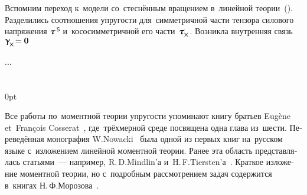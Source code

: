 

\label{para:caseoflatenttrihedron.largedisplacementsandrotations}

\begin{otherlanguage}{russian}

Вспомним переход к~модели со~стеснённым вращением в~линейной теории~(). Разделились соотношения упругости для~симметричной части тензора силового напряжения ${\forcestresstensor^{\hspace{.32ex}\mathsf{S}}}\hspace{-0.2ex}$ и~кососимметричной его части~${\forcestresstensor_{\hspace{-0.1ex}\Xcompanion}}$. Возникла внутренняя связь~${\distortiontensor_{\hspace{-0.25ex}\Xcompanion} \hspace{-0.32ex} = \bm{0}}$

...




\end{otherlanguage}

\section*{\small \wordforbibliography}

\begin{changemargin}{\parindent}{0pt}
\fontsize{10}{12}\selectfont

\begin{otherlanguage}{russian}

Все работы по~моментной теории упругости упоминают книгу братьев Eugène et~François Cosserat~\cite{cosserat}, где~трёх\-мерной среде посвящена одна глава из~шести. Переведённая монография \hbox{W\hspace{-0.2ex}.\:Nowacki}~\cite{nowacki-elasticity} была одной из первых книг на~русском языке с~изложением линейной моментной теории. Ранее эта область представлялась статьями~--- например, R.\,D.\:Mindlin’а и~H.\,F.\:Tiersten’а~\cite{mindlin.tiersten}. Краткое изложение моментной теории, но с~подробным рассмотрением задач содержится в~книгах Н.\,Ф.\:Морозова~\cite{morozov-twodimensionalproblems, morozov-fractures}.

\end{otherlanguage}

\end{changemargin}
